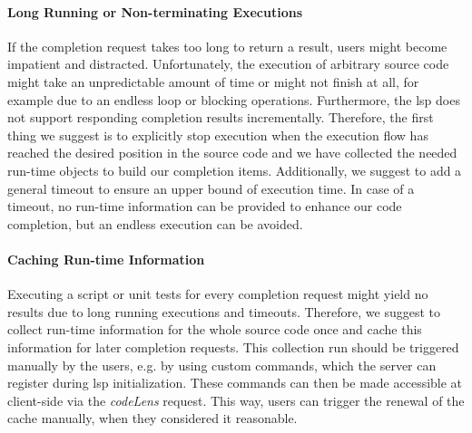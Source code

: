 \documentclass[sigplan,10pt,review,anonymous]{acmart}
\begin{document}
    \paragraph{Long Running or Non-terminating Executions}
    If the completion request takes too long to return a result, users might become impatient and distracted. Unfortunately, the execution of arbitrary source code might take an unpredictable amount of time or might not finish at all, for example due to an endless loop or blocking operations. Furthermore, the \ac{lsp} does not support responding completion results incrementally. Therefore, the first thing we suggest is to explicitly stop execution when the execution flow has reached the desired position in the source code and we have collected the needed run-time objects to build our completion items. Additionally, we suggest to add a general timeout to ensure an upper bound of execution time. In case of a timeout, no run-time information can be provided to enhance our code completion, but an endless execution can be avoided.

    \paragraph{Caching Run-time Information}
    Executing a script or unit tests for every completion request might yield no results due to long running executions and timeouts. Therefore, we suggest to collect run-time information for the whole source code once and cache this information for later completion requests. This collection run should be triggered manually by the users, e.g. by using custom commands, which the server can register during \ac{lsp} initialization. These commands can then be made accessible at client-side via the \emph{codeLens} request. This way, users can trigger the renewal of the cache manually, when they considered it reasonable.
    
\end{document}
